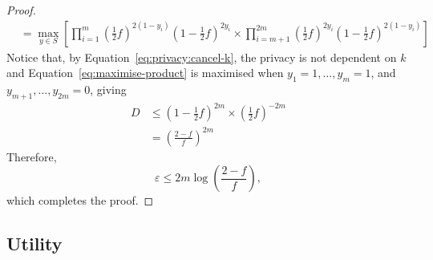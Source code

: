 \documentclass{article}
\begin{document}
\begin{proof}
\begin{align}
			&=\max_{y\in S}\left[%
				\prod\limits_{i=1}^m \left(\frac{1}{2}f\right)^{2(1-y_i)}\left(1-\frac{1}{2}f\right)^{2y_i}%
				\times \prod\limits_{i=m+1}^{2m}\left(\frac{1}{2}f\right)^{2y_i} \left(1-\frac{1}{2}f\right)^{2(1-y_i)}\right]\label{eq:maximise-product}%
	\end{align}
	Notice that, by Equation~\ref{eq:privacy:cancel-k}, the privacy is not dependent on $k$ and Equation~\ref{eq:maximise-product} is maximised when $y_1=1,\ldots,y_m=1$, and $y_{m+1},\ldots,y_{2m}=0$, giving
	\begin{align*}
		D &\leq \left(1-\frac{1}{2}f\right)^{2m}\times\left(\frac{1}{2}f\right)^{-2m}\\
			&= \left(\frac{2-f}{f}\right)^{2m}
	\end{align*}
	Therefore,
	\begin{equation}
		\varepsilon \leq 2m\log\left(\frac{2-f}{f}\right),
	\end{equation}
    which completes the proof.
\end{proof}

\subsection{Utility}
\end{document}
